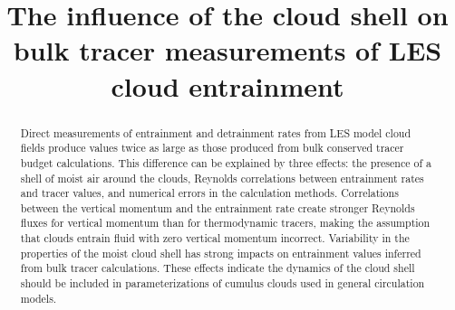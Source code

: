 \documentclass[draft,grl]{agutex}
\begin{document}
%
%


\title{The influence of the cloud shell on bulk tracer measurements of LES 
cloud entrainment}
%

%
%






%
%


\begin{abstract}
Direct measurements of entrainment and detrainment rates from LES model 
cloud fields produce values twice as large as those produced from bulk 
conserved tracer budget calculations.  This difference can be explained by 
three effects: the presence of a shell of moist air around the clouds, Reynolds 
correlations between entrainment rates and tracer values, and numerical errors 
in the calculation methods.  Correlations between the vertical momentum and the
entrainment rate create stronger Reynolds fluxes for vertical momentum than for
thermodynamic tracers, making the assumption that clouds entrain fluid with 
zero vertical momentum incorrect.  Variability in the properties of the moist 
cloud shell has strong impacts on entrainment values inferred from bulk tracer 
calculations.  These effects indicate the dynamics of the cloud shell should be 
included in parameterizations of cumulus clouds used in general circulation 
models.
\end{abstract}
\end{document}
